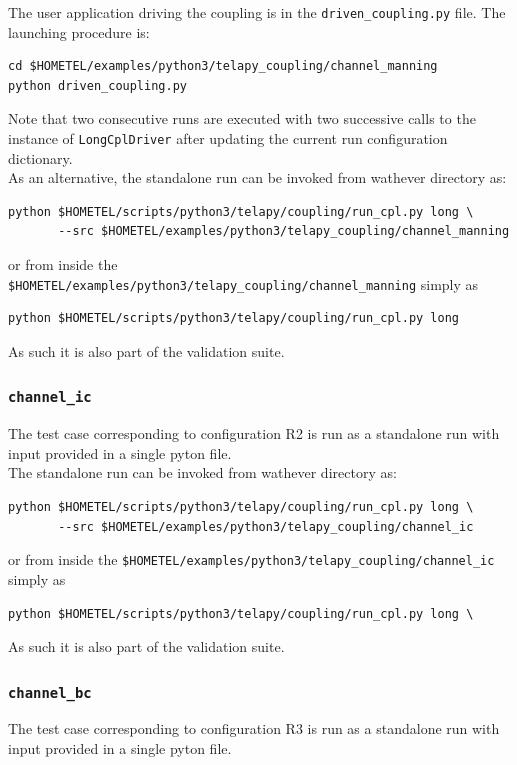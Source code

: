 \documentclass[Coupling]{../../data/TelemacDoc} %
\begin{document}
The user application driving the coupling is in the
\texttt{driven\_coupling.py} file. The launching procedure is:
\begin{verbatim}
cd $HOMETEL/examples/python3/telapy_coupling/channel_manning
python driven_coupling.py
\end{verbatim}
Note that two consecutive runs are executed with two successive
calls to the instance of \texttt{LongCplDriver} after updating the
current run configuration dictionary.\\

As an alternative, the standalone run can be invoked from wathever
directory as:
\begin{verbatim}
python $HOMETEL/scripts/python3/telapy/coupling/run_cpl.py long \
       --src $HOMETEL/examples/python3/telapy_coupling/channel_manning
\end{verbatim}
or from inside the
\texttt{\$HOMETEL/examples/python3/telapy\_coupling/channel\_manning}
simply as
\begin{verbatim}
python $HOMETEL/scripts/python3/telapy/coupling/run_cpl.py long
\end{verbatim}
As such it is also part of the validation suite.

\subsubsection{\texttt{channel\_ic}}
The test case corresponding to configuration R2 is run as a standalone
run with input provided in a single pyton file.\\

The standalone run can be invoked from wathever
directory as:
\begin{verbatim}
python $HOMETEL/scripts/python3/telapy/coupling/run_cpl.py long \
       --src $HOMETEL/examples/python3/telapy_coupling/channel_ic
\end{verbatim}
or from inside the
\texttt{\$HOMETEL/examples/python3/telapy\_coupling/channel\_ic}
simply as
\begin{verbatim}
python $HOMETEL/scripts/python3/telapy/coupling/run_cpl.py long \
\end{verbatim}
As such it is also part of the validation suite.

\subsubsection{\texttt{channel\_bc}}
The test case corresponding to configuration R3 is run as a standalone
run with input provided in a single pyton file.\\
\end{document}
